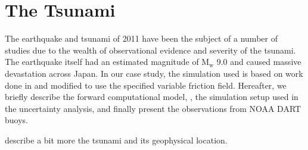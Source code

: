 
\section{The \tohoku Tsunami} 
\label{sec:tohoku}

The \tohoku earthquake and tsunami of 2011 have been the subject of a number of
studies due to the wealth of observational evidence and severity of the tsunami.
The earthquake itself had an estimated magnitude of $\text{M}_\text{w}$ 9.0 and
caused massive devastation across Japan.  In our case study, the
simulation used is based on work done in \cite{MacInnes:2013cr} and modified to 
use the specified variable friction field. Hereafter, we briefly describe the
forward computational model, \geoclaw, the  simulation setup used in the
uncertainty analysis, and finally present the observations from NOAA DART buoys.

\alert{describe a bit more the tsunami and its geophysical location}.


